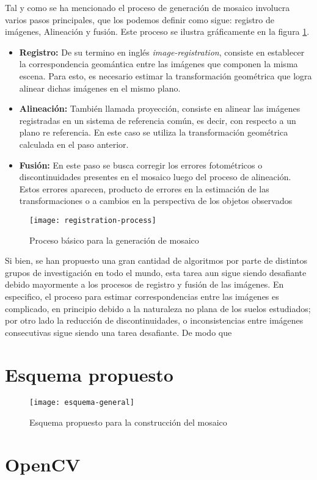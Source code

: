 Tal y como se ha mencionado el proceso de generación de mosaico involucra varios pasos principales, que los podemos definir como sigue: registro de imágenes, Alineación y fusión. Este proceso se ilustra gráficamente en la figura \ref{imagen:mosaic-process}.

\begin{itemize}
	\item \textbf{Registro:} De su termino en inglés \textit{image-registration}, consiste en establecer la correspondencia geomántica entre las imágenes que componen la misma escena. Para esto, es necesario estimar la transformación geométrica que logra alinear dichas imágenes en el mismo plano.
	
	\item \textbf{Alineación:} También llamada proyección, consiste en alinear las imágenes registradas en un sistema de referencia común, es decir, con respecto a un plano re referencia. En este caso se utiliza la transformación geométrica calculada en el paso anterior.
	
	\item \textbf{Fusión:} En este paso se busca corregir los errores fotométricos o discontinuidades presentes en el mosaico luego del proceso de alineación. Estos errores aparecen, producto de errores en la estimación de las transformaciones o a cambios en la perspectiva de los objetos observados
\end{itemize}

\begin{figure}[H]
	\centerline{
		\texttt{[image: registration-process]}}
	\caption{Proceso básico para la generación de mosaico}
	\label{imagen:mosaic-process}
\end{figure}

Si bien, se han propuesto una gran cantidad de algoritmos por parte de distintos grupos de investigación en todo el mundo, esta tarea aun sigue siendo desafiante debido mayormente a los procesos de registro y fusión de las imágenes. En especifico, el proceso para estimar correspondencias entre las imágenes es complicado, en principio debido a la naturaleza no plana de los suelos estudiados; por otro lado la reducción de discontinuidades, o inconsistencias entre imágenes consecutivas sigue siendo una tarea desafiante. De modo que 

\section{Esquema propuesto}

\begin{figure}[H]
	\centerline{
		\texttt{[image: esquema-general]}}
		\caption{Esquema propuesto para la construcción del mosaico}
	
	\label{imagen:esquema}
\end{figure}

\section{OpenCV}